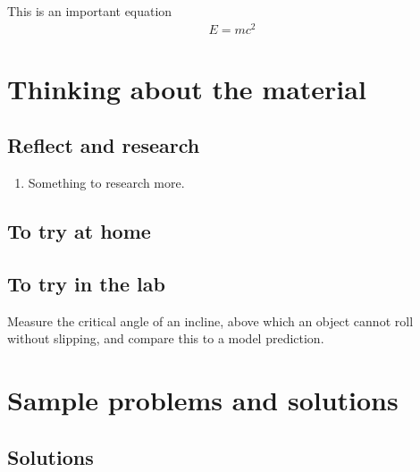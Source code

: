 \newpage
\begin{importantEquations}
This is an important equation
\begin{align*}
E = mc^2
\end{align*}

\end{importantEquations}


\newpage
\section{Thinking about the material}
\subsection{Reflect and research}

\begin{enumerate}
\item Something to research more.
\end{enumerate}
\subsection{To try at home}


\subsection{To try in the lab}
Measure the critical angle of an incline, above which an object cannot roll without slipping, and compare this to a model prediction. 

\newpage
\section{Sample problems and solutions}


\newpage
\subsection{Solutions}


